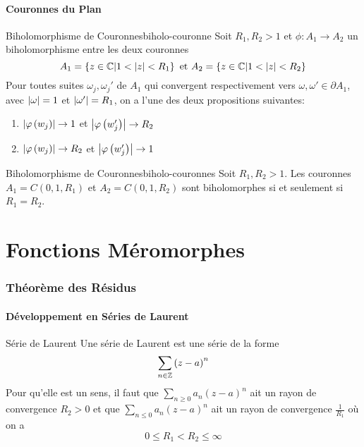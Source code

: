 \documentclass{cours}
\begin{document}
\subsection{Couronnes du Plan}
\begin{lemme}
	{Biholomorphisme de Couronnes}{biholo-couronne}
	Soit $R_{1}, R_{2} > 1$ et $\phi: A_{1} \to A_{2}$ un biholomorphisme entre les deux couronnes
	\begin{equation*}
		A_{1} = \left\{z \in \mathbb{C} \middle| 1< \left|z\right| < R_{1}\right\} \text{ et } A_{2} = \left\{ z \in \mathbb{C} \middle| 1 < \left|z\right| < R_{2}\right\}
	\end{equation*}
	Pour toutes suites $\omega_{j}, \omega_{j}'$ de $A_{1}$ qui convergent respectivement vers $\omega, \omega' \in \partial A_{1}$, avec $\left|\omega\right| = 1$ et $\left|\omega'\right| = R_{1}$, on a l'une des deux propositions suivantes:
	\begin{enumerate}
		\item $\left|\varphi\left(w_{j}\right)\right| \to 1$ et $\left|\varphi\left(w_{j}'\right)\right| \to R_{2}$
		\item $\left|\varphi\left(w_{j}\right)\right| \to R_{2}$ et $\left|\varphi\left(w_{j}'\right)\right| \to 1$
	\end{enumerate}
\end{lemme}

\begin{théorème}
	{Biholomorphisme de Couronnes}{biholo-couronnes}
	Soit $R_{1}, R_{2} > 1$. Les couronnes $A_{1} = C\left(0, 1, R_{1}\right)$ et $A_{2} = C\left(0, 1, R_{2}\right)$ sont biholomorphes si et seulement si $R_{1} = R_{2}$.
\end{théorème}

\part{Fonctions Méromorphes}
\section{Théorème des Résidus}
\subsection{Développement en Séries de Laurent}
\begin{définition}
	{Série de Laurent}{}
	Une série de Laurent est une série de la forme \begin{equation*}
		\sum_{n\in \mathbb{Z}}\left(z - a\right)^{n}
	\end{equation*}
	Pour qu'elle est un sens, il faut que $\sum_{n \geq 0}a_{n}\left(z - a\right)^{n}$ ait un rayon de convergence $R_{2} > 0$ et que $\sum_{n \leq 0} a_{n}\left(z - a\right)^{n}$ ait un rayon de convergence $\frac{1}{R_{1}}$ où on a \begin{equation*}
		0 \leq R_{1} < R_{2} \leq \infty
	\end{equation*}
\end{définition}
\end{document}
